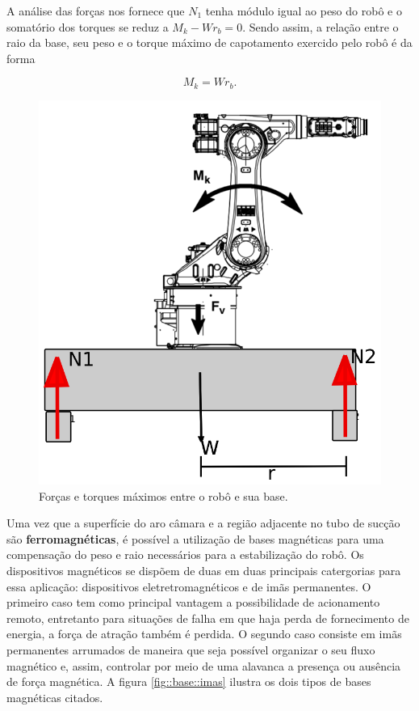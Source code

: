 A análise das forças nos fornece que $N_1$ tenha módulo igual ao peso do robô e
o somatório dos torques se reduz a $M_k-Wr_b=0$. Sendo assim, a relação entre
o raio da base, seu peso e o torque máximo de capotamento exercido pelo robô é
da forma 

$$M_k=Wr_b.$$

\begin{figure}[h!]
\centering
	\includegraphics[width=0.5\columnwidth]{figs/base/tilt}
	\caption{Forças e torques máximos entre o robô e sua base.}
	\label{fig::tilt_robot}
\end{figure}

Uma vez que a superfície do aro câmara e a região adjacente no tubo de sucção
são \textbf{ferromagnéticas}, é possível a utilização de bases magnéticas para
uma compensação do peso e raio necessários para a estabilização do robô. Os
dispositivos magnéticos se dispõem de duas em duas principais catergorias para
essa aplicação:
dispositivos eletretromagnéticos e de imãs permanentes. O primeiro caso tem como
principal vantagem a possibilidade de acionamento remoto, entretanto para situações de
falha em que haja perda de fornecimento de energia, a força de atração também é
perdida. O segundo caso consiste em imãs permanentes arrumados de maneira que
seja possível organizar o seu fluxo magnético e, assim, controlar por meio de
uma alavanca a presença ou ausência de força magnética. A figura
\ref{fig::base::imas} ilustra os dois tipos de bases magnéticas citados.

